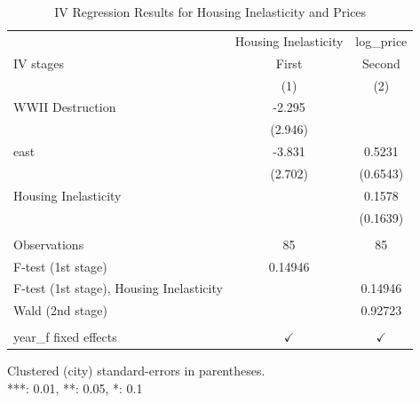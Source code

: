 
\begin{table}[htbp]
   \caption{\label{tab:iv_results} IV Regression Results for Housing Inelasticity and Prices}
   \bigskip
   \centering
   \begin{tabular}{lcc}
      \toprule
                                               & Housing Inelasticity & log\_price\\   
      IV stages                                & First                & Second \\   
                                               & (1)                  & (2)\\  
      \midrule 
      WWII Destruction                         & -2.295               &   \\   
                                               & (2.946)              &   \\   
      east                                     & -3.831               & 0.5231\\   
                                               & (2.702)              & (0.6543)\\   
      Housing Inelasticity                     &                      & 0.1578\\   
                                               &                      & (0.1639)\\   
       \\
      Observations                             & 85                   & 85\\  
      F-test (1st stage)                       & 0.14946              & \\  
      F-test (1st stage), Housing Inelasticity &                      & 0.14946\\  
      Wald (2nd stage)                         &                      & 0.92723\\  
       \\
      year\_f fixed effects                    & $\checkmark$         & $\checkmark$\\   
      \bottomrule
   \end{tabular}
   
   \par \raggedright 
   Clustered (city) standard-errors in parentheses.\\
   ***: 0.01, **: 0.05, *: 0.1
\end{table}


